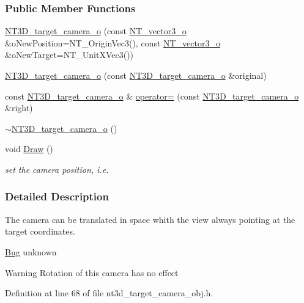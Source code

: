 \subsubsection*{Public Member Functions}
\begin{DoxyCompactItemize}
\item 
\hyperlink{class_n_t3_d__target__camera__o_afa47e703c954b1785ca36b057f60e291}{NT3D\_\-target\_\-camera\_\-o} (const \hyperlink{class_n_t__vector3__o}{NT\_\-vector3\_\-o} \&oNewPosition=NT\_\-OriginVec3(), const \hyperlink{class_n_t__vector3__o}{NT\_\-vector3\_\-o} \&oNewTarget=NT\_\-UnitXVec3())
\item 
\hyperlink{class_n_t3_d__target__camera__o_aedcf1b0bad594f8212f2154e24edc8ec}{NT3D\_\-target\_\-camera\_\-o} (const \hyperlink{class_n_t3_d__target__camera__o}{NT3D\_\-target\_\-camera\_\-o} \&original)
\item 
const \hyperlink{class_n_t3_d__target__camera__o}{NT3D\_\-target\_\-camera\_\-o} \& \hyperlink{class_n_t3_d__target__camera__o_adcb27395e80572b4e1987f3e6376ab5d}{operator=} (const \hyperlink{class_n_t3_d__target__camera__o}{NT3D\_\-target\_\-camera\_\-o} \&right)
\item 
\hyperlink{class_n_t3_d__target__camera__o_ac703319f625b9a7c6a7eda871aa609eb}{$\sim$NT3D\_\-target\_\-camera\_\-o} ()
\item 
void \hyperlink{class_n_t3_d__target__camera__o_a2f5e1222a66bc7da4b24f84376a6afa7}{Draw} ()
\begin{DoxyCompactList}\small\item\em set the camera position, i.e. \item\end{DoxyCompactList}\end{DoxyCompactItemize}


\subsubsection{Detailed Description}
The camera can be translated in space whith the view always pointing at the target coordinates. \begin{Desc}
\item[\hyperlink{bug__bug000041}{Bug}]unknown \end{Desc}
\begin{DoxyWarning}{Warning}
Rotation of this camera has no effect 
\end{DoxyWarning}


Definition at line 68 of file nt3d\_\-target\_\-camera\_\-obj.h.



